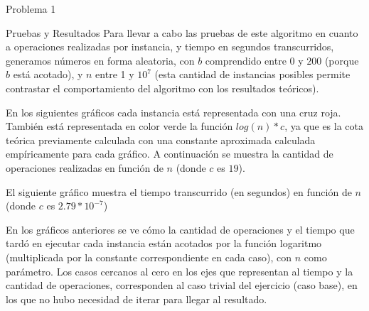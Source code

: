 \begin{section}{Problema 1}
\begin{subsection}{Pruebas y Resultados}
		Para llevar a cabo las pruebas de este algoritmo en cuanto a operaciones realizadas por instancia, y tiempo en segundos transcurridos, generamos números en forma aleatoria, con $b$ comprendido entre $0$ y $200$ (porque $b$ está acotado), y $n$ entre 1 y $10^7$ (esta cantidad de instancias posibles permite contrastar el comportamiento del algoritmo con los resultados teóricos). 

En los siguientes gráficos cada instancia está representada con una cruz roja. También está representada en color verde la función $log(n)*c$, ya que es la cota teórica previamente calculada con una constante aproximada calculada empíricamente para cada gráfico.
A continuación se muestra la cantidad de operaciones realizadas en función de $n$ (donde $c$ es $19$). \\
		\VSP

El siguiente gráfico muestra el tiempo transcurrido (en segundos) en función de $n$ (donde $c$ es $2.79*10^{-7}$)\\

En los gráficos anteriores se ve cómo la cantidad de operaciones y el tiempo que tardó en ejecutar cada instancia están acotados por la función logaritmo (multiplicada por la constante correspondiente en cada caso), con $n$ como parámetro. Los casos cercanos al cero en los ejes que representan al tiempo y la cantidad de operaciones, co\-rres\-pon\-den al caso trivial del ejercicio (caso base), en los que no hubo necesidad de iterar para llegar al resultado.


\end{subsection}
\end{section}
